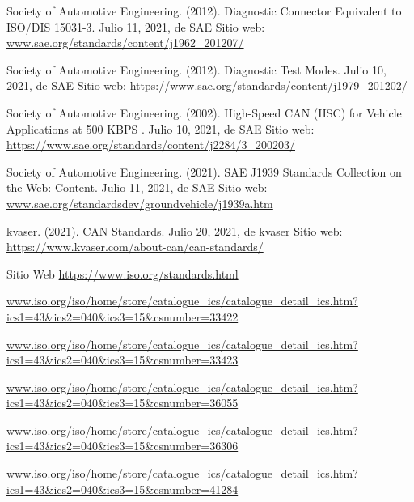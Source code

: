 \begin{thebibliography}{99}
 Society of Automotive Engineering. (2012). Diagnostic Connector Equivalent to ISO/DIS 15031-3. Julio 11, 2021, de SAE Sitio web: \url{www.sae.org/standards/content/j1962_201207/}


 Society of Automotive Engineering. (2012). Diagnostic Test Modes. Julio 10, 2021, de SAE Sitio web: \url{ https://www.sae.org/standards/content/j1979_201202/}

 Society of Automotive Engineering. (2002). High-Speed CAN (HSC) for Vehicle Applications at 500 KBPS . Julio 10, 2021, de SAE Sitio web: \url{ https://www.sae.org/standards/content/j2284/3_200203/}

 Society of Automotive Engineering. (2021). SAE J1939 Standards Collection on the Web: Content. Julio 11, 2021, de SAE Sitio web: \url{www.sae.org/standardsdev/groundvehicle/j1939a.htm}

 kvaser. (2021). CAN Standards. Julio 20, 2021, de kvaser Sitio web: \url{https://www.kvaser.com/about-can/can-standards/}


 Sitio Web \url{https://www.iso.org/standards.html}

 \url{www.iso.org/iso/home/store/catalogue_ics/catalogue_detail_ics.htm?ics1=43&ics2=040&ics3=15&csnumber=33422}

 \url{www.iso.org/iso/home/store/catalogue_ics/catalogue_detail_ics.htm?ics1=43&ics2=040&ics3=15&csnumber=33423}

 \url{www.iso.org/iso/home/store/catalogue_ics/catalogue_detail_ics.htm?ics1=43&ics2=040&ics3=15&csnumber=36055}


 \url{www.iso.org/iso/home/store/catalogue_ics/catalogue_detail_ics.htm?ics1=43&ics2=040&ics3=15&csnumber=36306}

 \url{www.iso.org/iso/home/store/catalogue_ics/catalogue_detail_ics.htm?ics1=43&ics2=040&ics3=15&csnumber=41284}


\end{thebibliography}
